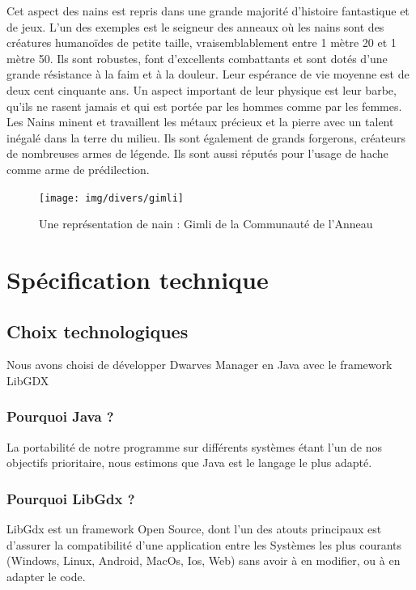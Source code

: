 \documentclass[a4paper]{report}
\begin{document}
Cet aspect des nains est repris dans une grande majorité d'histoire fantastique et de jeux. L'un des exemples est le seigneur des anneaux où les nains sont des créatures humanoïdes de petite taille, vraisemblablement entre
1 mètre 20 et 1 mètre 50. Ils sont robustes, font d'excellents combattants et sont dotés d'une grande résistance à la faim et à la douleur. Leur espérance de vie moyenne est de deux cent cinquante ans. Un aspect important de
leur physique est leur barbe, qu'ils ne rasent jamais et qui est portée par les hommes comme par les femmes. Les Nains minent et travaillent les métaux précieux et la pierre avec un talent inégalé dans la terre du milieu.
Ils sont également de grands forgerons, créateurs de nombreuses armes de légende. Ils sont aussi réputés pour l'usage de hache comme arme de prédilection.


\begin{figure}[hb!]
    \center
    \texttt{[image: img/divers/gimli]}
    \caption{Une représentation de nain : Gimli de la Communauté de l'Anneau}
		\label{Nain}
\end{figure}

\clearpage

\newpage
\part{Spécification technique}

\chapter*{Choix technologiques}

Nous avons choisi de développer Dwarves Manager en Java avec le framework LibGDX

\section*{Pourquoi Java ?}

La portabilité de notre programme sur différents systèmes étant l'un de nos objectifs prioritaire, nous estimons que Java est le langage le plus adapté.

\section*{Pourquoi LibGdx ?}

LibGdx est un framework Open Source, dont l'un des atouts principaux est d'assurer la compatibilité d'une application entre les Systèmes les plus courants (Windows, Linux, Android, MacOs, Ios, Web)  sans avoir à en modifier, ou à en adapter le code.
\end{document}
